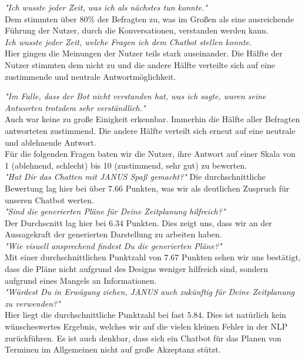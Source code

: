 \textit{"Ich wusste jeder Zeit, was ich als nächstes tun konnte."}\\
Dem stimmten über $80\%$ der Befragten zu, was im Großen als eine ausreichende Führung der Nutzer, durch die Konversationen, verstanden werden kann.\\

\textit{Ich wusste jeder Zeit, welche Fragen ich dem Chatbot stellen konnte.}\\
Hier gingen die Meinungen der Nutzer teils stark auseinander. Die Hälfte der Nutzer stimmten dem nicht zu und die andere Hälfte verteilte sich auf eine zustimmende und neutrale Antwortmöglichkeit.


\textit{"Im Falle, dass der Bot nicht verstanden hat, was ich sagte, waren seine Antworten trotzdem sehr verständlich."}\\
Auch war keine zu große Einigkeit erkennbar. Immerhin die Hälfte aller Befragten antworteten zustimmend. Die andere Hälfte verteilt sich erneut auf eine neutrale und ablehnende Antwort.\\

Für die folgenden Fragen baten wir die Nutzer, ihre Antwort auf einer Skala von 1 (ablehnend, schlecht) bis 10 (zustimmend, sehr gut) zu bewerten.\\

\textit{"Hat Dir das Chatten mit JANUS Spaß gemacht?"}
Die durchschnittliche Bewertung lag hier bei über $7.66$ Punkten, was wir als deutlichen Zuspruch für unseren Chatbot werten.\\

\textit{"Sind die generierten Pläne für Deine Zeitplanung hilfreich?"}\\
Der Durchscnitt lag hier bei $6.34$ Punkten. Dies zeigt uns, dass wir an der Aussagekraft der generierten Darstellung zu arbeiten haben.\\

\textit{"Wie visuell ansprechend findest Du die generierten Pläne?"}\\
Mit einer durchschnittlichen Punktzahl von $7.67$ Punkten sehen wir uns bestätigt, dass die Pläne nicht aufgrund des Designs weniger hilfreich sind, sondern aufgrund eines Mangels an Informationen.\\

\textit{"Würdest Du in Erwägung ziehen, JANUS auch zukünftig für Deine Zeitplanung zu verwenden?"}\\
Hier liegt die durchschnittliche Punktzahl bei fast $5.84$. Dies ist natürlich kein wünscheswertes Ergebnis, welches wir auf die vielen kleinen Fehler in der NLP zurückführen. Es ist auch denkbar, dass sich ein Chatbot für das Planen von Terminen im Allgemeinen nicht auf große Akzeptanz stützt. 

